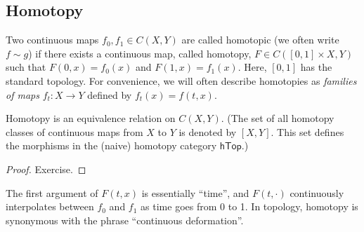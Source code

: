 \subsection{Homotopy}\label{sec.homotopy}
\begin{defn} Two continuous maps $f_0,f_1\in C(X, Y)$ are called homotopic (we often write $f\sim g$) if there exists a continuous map, called homotopy, $F\in C([0,1]\times X,Y)$ such that $F(0,x)=f_0(x)$ and $F(1,x)=f_1(x)$. Here, $[0,1]$ has the standard topology. For convenience, we will often describe homotopies as \emph{families of maps} $f_t:X\to Y$ defined by $f_t(x)=f(t,x)$.
\end{defn}
\begin{prop}
Homotopy is an equivalence relation on $C(X,Y)$. (The set of all homotopy classes of continuous maps from $X$ to $Y$ is denoted by $[X,Y]$. This set defines the morphisms in the (naive) homotopy category $\mathsf{hTop}$.)
\end{prop}
\begin{proof}
Exercise.
\end{proof}

The first argument of $F(t,x)$ is essentially ``time'', and $F(t,\cdot)$ continuously interpolates between $f_0$ and $f_1$ as time goes from 0 to 1. In topology, homotopy is synonymous with the phrase ``continuous deformation''.



